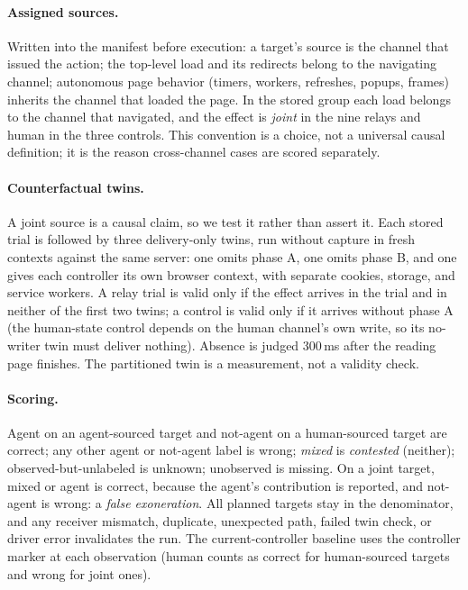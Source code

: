 \documentclass[11pt]{article}
\theoremstyle{definition}
\begin{document}
\paragraph{Assigned sources.} Written into the manifest before execution: a target's
source is the channel that issued the action; the top-level load and its
redirects belong to the navigating channel; autonomous page behavior (timers,
workers, refreshes, popups, frames) inherits the channel that loaded the page.
In the stored group each load belongs to the channel that navigated, and the
effect is \emph{joint} in the nine relays and human in the three controls. This
convention is a choice, not a universal causal definition; it is the reason
cross-channel cases are scored separately.

\paragraph{Counterfactual twins.} A joint source is a causal claim, so we test it
rather than assert it. Each stored trial is followed by three delivery-only
twins, run without capture in fresh contexts against the same server: one omits
phase A, one omits phase B, and one gives each controller its own browser
context, with separate cookies, storage, and service workers. A relay trial is
valid only if the effect arrives in the trial and in neither of the first two
twins; a control is valid only if it arrives without phase A (the human-state
control depends on the human channel's own write, so its no-writer twin must
deliver nothing). Absence is judged 300\,ms after the reading page finishes. The
partitioned twin is a measurement, not a validity check.

\paragraph{Scoring.} Agent on an agent-sourced target and not-agent on a
human-sourced target are correct; any other agent or not-agent label is wrong;
\emph{mixed} is \emph{contested} (neither); observed-but-unlabeled is unknown;
unobserved is missing. On a joint target, mixed or agent is correct, because the
agent's contribution is reported, and not-agent is wrong: a \emph{false
exoneration}. All planned targets stay in the denominator, and any receiver
mismatch, duplicate, unexpected path, failed twin check, or driver error
invalidates the run. The current-controller baseline uses the controller marker
at each observation (human counts as correct for human-sourced targets and wrong
for joint ones).
\end{document}
